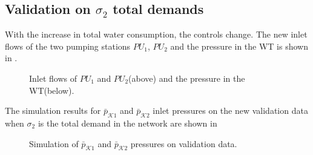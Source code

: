 \subsection{Validation on $\sigma_2$ total demands}
 \label{validation_sigma1}

 With the increase in total water consumption, the controls change. The new inlet flows of the two pumping stations $PU_1$, $PU_2$ and the pressure in the WT is shown in .

\vspace{-2mm}

 \begin{figure}[H]
 \centering
  
 \vspace{-2.5mm}
 \label{fig:dk_sigma2}
 \end{figure}

 \vspace{-6.5mm}

 \begin{figure}[H]
 \centering
 \hspace{-3.5mm}
  
 \vspace{-2.5mm}
 \caption{Inlet flows of $PU_1$ and $PU_2$(above) and the pressure in the WT(below).}
 \label{fig:WT_sigma2}
 \end{figure}

 \vspace{-3mm}

The simulation results for $\bar{p}_{\mathcal{K}1}$ and $\bar{p}_{\mathcal{K}2}$ inlet pressures on the new validation data when $\sigma_2$ is the total demand in the network are shown in 

\vspace{-2mm}

 \begin{figure}[H]
 \centering
  
 \vspace{-2.5mm}
 \caption{Simulation of $\bar{p}_{\mathcal{K}1}$ and $\bar{p}_{\mathcal{K}2}$ pressures on validation data.}
 \label{fig:pk1_sigma2}
 \end{figure}

